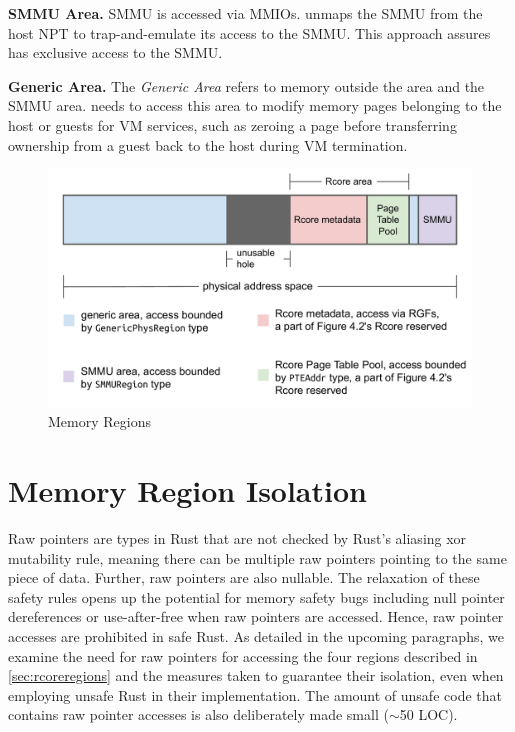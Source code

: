 \textbf{SMMU Area.}
SMMU is accessed via MMIOs. \rustcore{} unmaps the SMMU
from the host NPT to trap-and-emulate its access to the SMMU. This
approach assures \rustcore{} has exclusive access to the SMMU.

\textbf{Generic Area.}
The \textit{Generic Area} refers to memory outside the \rustcore{} area and the SMMU area.
\rustcore{} needs to access this area to modify memory pages
belonging to the host or guests for VM services, such as zeroing a page
before transferring ownership from a guest back to the host during VM termination.

\begin{figure}[ht]
\centering
\includegraphics[width=1.00\textwidth]{figures/regions.pdf}
\caption{Memory Regions}
\label{fig:regions}
\end{figure}

\section{Memory Region Isolation}
\label{sec:memiso}

Raw pointers are types in Rust that are not checked by Rust's aliasing xor
mutability rule, meaning there can be multiple raw pointers pointing to the
same piece of data. Further, raw pointers are also nullable. The relaxation of
these safety rules opens up the potential for memory safety bugs including
null pointer dereferences or use-after-free when raw pointers are accessed.
Hence, raw pointer accesses are prohibited in safe Rust.
As detailed in the upcoming paragraphs, we examine the need for raw pointers
for accessing the four regions described in \autoref{sec:rcoreregions} and the
measures taken to guarantee their isolation, even when employing unsafe Rust in
their implementation. The amount of unsafe code that contains raw pointer
accesses is also deliberately made small ($\sim$50 LOC).


